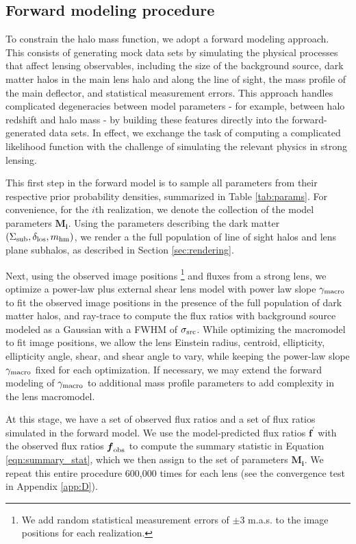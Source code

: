 \subsection{Forward modeling procedure}
\label{ssec:forwardmodeling}

To constrain the halo mass function, we adopt a forward modeling approach. This consists of generating mock data sets by simulating the physical processes that affect lensing observables, including the size of the background source, dark matter halos in the main lens halo and along the line of sight, the mass profile of the main deflector, and statistical measurement errors. This approach handles complicated degeneracies between model parameters - for example, between halo redshift and halo mass \citep{Despali++18} - by building these features directly into the forward-generated data sets. In effect, we exchange the task of computing a complicated likelihood function with the challenge of simulating the relevant physics in strong lensing.

This first step in the forward model is to sample all parameters from their respective prior probability densities, summarized in Table \ref{tab:params}. For convenience, for the $i$th realization, we denote the collection of the model parameters $\boldsymbol{M_i}$. Using the parameters describing the dark matter $\left(\Sigma_{\rm{sub}}, \delta_{\rm{los}}, {m_{\rm{hm}}} \right)$, we render a the full population of line of sight halos and lens plane subhalos, as described in Section \ref{sec:rendering}. 

Next, using the observed image positions \footnote{We add random statistical measurement errors of $\pm 3$ m.a.s. to the image positions for each realization.} and fluxes from a strong lens, we optimize a power-law plus external shear lens model with power law slope $\gamma_{\rm{macro}}$ to fit the observed image positions in the presence of the full population of dark matter halos, and ray-trace to compute the flux ratios with background source modeled as a Gaussian with a FWHM of $\sigma_{\rm{src}}$. While optimizing the macromodel to fit image positions, we allow the lens Einstein radius, centroid, ellipticity, ellipticity angle, shear, and shear angle to vary, while keeping the power-law slope $\gamma_{\rm{macro}}$ fixed for each optimization. If necessary, we may extend the forward modeling of $\gamma_{\rm{macro}}$ to additional mass profile parameters to add complexity in the lens macromodel. 

At this stage, we have a set of observed flux ratios and a set of flux ratios simulated in the forward model. We use the model-predicted flux ratios $\boldsymbol{f^{\prime}}$ with the observed flux ratios $\boldsymbol{f}_{\rm{obs}}$ to compute the summary statistic in Equation \ref{eqn:summary_stat}, which we then assign to the set of parameters $\boldsymbol{M_i}$. We repeat this entire procedure 600,000 times for each lens (see the convergence test in Appendix \ref{app:D}). 

